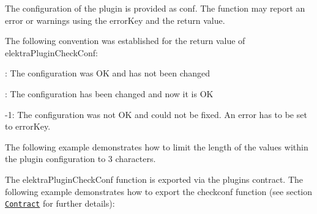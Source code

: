 The configuration of the plugin is provided as {\ttfamily conf}. The function may report an error or warnings using the {\ttfamily error\+Key} and the return value.

The following convention was established for the return value of {\ttfamily elektra\+Plugin\+Check\+Conf}\+:


\begin{DoxyItemize}
\item {}\+: The configuration was OK and has not been changed
\item {}\+: The configuration has been changed and now it is OK
\item {\ttfamily -\/1}\+: The configuration was not OK and could not be fixed. An error has to be set to error\+Key.
\end{DoxyItemize}

The following example demonstrates how to limit the length of the values within the plugin configuration to 3 characters.




The {\ttfamily elektra\+Plugin\+Check\+Conf} function is exported via the plugin\textquotesingle{}s contract. The following example demonstrates how to export the {\ttfamily checkconf} function (see section \href{#contract}{\tt Contract} for further details)\+:


